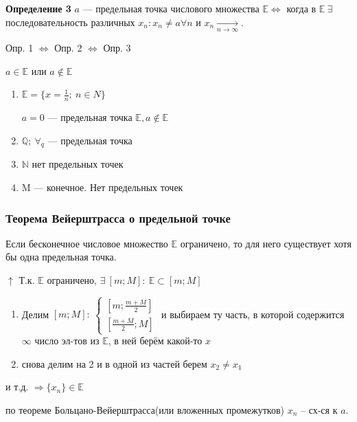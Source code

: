 \documentclass{article}
\begin{document}
    \textbf{Определение 3} \(a\) --- предельная точка числового множества \(\mathbb{E} \Leftrightarrow\) когда в \(\mathbb{E}\ \exists\) последовательность различных \(x_n: x_n \neq a \forall n\) и \(x_n \xrightarrow[n \rightarrow \infty]{}\).

    Опр. 1 \(\Leftrightarrow\) Опр. 2 \(\Leftrightarrow\) Опр. 3

    \(a \in \mathbb{E}\) или \(a \not\in \mathbb{E}\)

    \begin{enumerate}
        \item \(\mathbb{E} = \{x=\frac{1}{n};\ n \in N\}\)

        \(a = 0\) --- предельная точка \(\mathbb{E}, a \not \in \mathbb{E}\)

        \item \(\mathbb{Q};\ \forall_q\) --- предельная точка

        \item \(\mathbb{N}\) нет предельных точек

        \item M --- конечное. Нет предельных точек
    \end{enumerate}

    \subsubsection{Теорема Вейерштрасса о предельной точке}
    Если бесконечное числовое множество \(\mathbb{E}\) ограничено, то для него существует хотя бы одна предельная точка.

    \(\uparrow\) Т.к. \(\mathbb{E}\) ограничено, \(\exists\ [m; M]:\ \mathbb{E} \subset  [m; M]\)

    \begin{enumerate}
        \item Делим \([m; M]:\ \begin{cases}[m; \frac{m+M}{2}]\\ [\frac{m+M}{2}; M]\end{cases}\)
        и выбираем ту часть, в которой содержится \(\infty\) число эл-тов из \(\mathbb{E}\), в ней берём какой-то \(x\)
        \item снова делим на 2 и в одной из частей берем \(x_2 \neq x_1\)
    \end{enumerate}
    и т.д. \(\Rightarrow \{x_n\} \in \mathbb{E}\)

    по теореме Больцано-Вейерштрасса(или вложенных промежутков) \(x_n\) -- сх-ся к \(a\).
\end{document}
